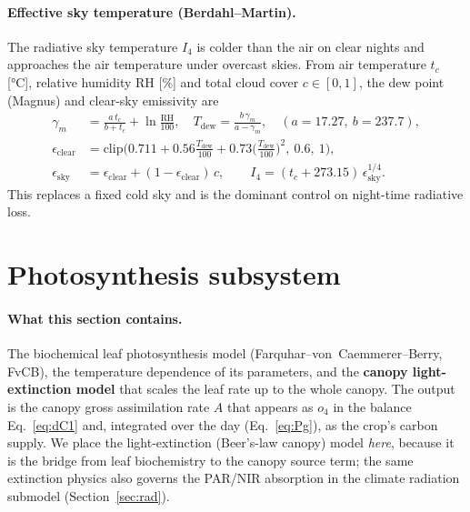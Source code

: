 \documentclass[11pt,a4paper]{article}
\begin{document}
\paragraph{Effective sky temperature (Berdahl--Martin).} The radiative sky temperature $I_4$ is
colder than the air on clear nights and approaches the air temperature under overcast skies. From
air temperature $t_c$ [\si{\degreeCelsius}], relative humidity $\mathrm{RH}$ [\%] and total cloud
cover $c\in[0,1]$, the dew point (Magnus) and clear-sky emissivity are
\begin{align}
  \gamma_m &= \frac{a\,t_c}{b+t_c}+\ln\frac{\mathrm{RH}}{100}, \quad
  T_{\text{dew}} = \frac{b\,\gamma_m}{a-\gamma_m}, \quad (a=17.27,\ b=237.7),\\
  \epsilon_{\text{clear}} &= \mathrm{clip}\!\Big(0.711 + 0.56\tfrac{T_{\text{dew}}}{100} + 0.73\big(\tfrac{T_{\text{dew}}}{100}\big)^2,\ 0.6,\ 1\Big),\\
  \epsilon_{\text{sky}} &= \epsilon_{\text{clear}} + (1-\epsilon_{\text{clear}})\,c, \qquad
  I_4 = (t_c+273.15)\,\epsilon_{\text{sky}}^{1/4}.
\end{align}
This replaces a fixed cold sky and is the dominant control on night-time radiative loss.

\section{Photosynthesis subsystem}\label{sec:photo}

\paragraph{What this section contains.} The biochemical leaf photosynthesis model
(Farquhar--von~Caemmerer--Berry, FvCB), the temperature dependence of its parameters, and the
\textbf{canopy light-extinction model} that scales the leaf rate up to the whole canopy. The output
is the canopy gross assimilation rate $A$ that appears as $o_4$ in the  balance
Eq.~\eqref{eq:dC1} and, integrated over the day (Eq.~\eqref{eq:Pg}), as the crop's carbon supply.
We place the light-extinction (Beer's-law canopy) model \emph{here}, because it is the bridge from
leaf biochemistry to the canopy source term; the same extinction physics also governs the PAR/NIR
absorption in the climate radiation submodel (Section~\ref{sec:rad}).
\end{document}
